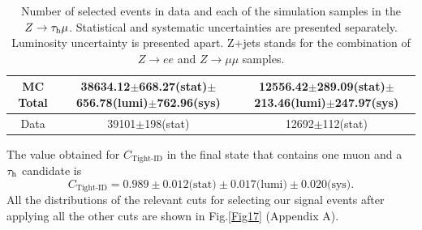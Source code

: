 \begin{table}[H]
{\begin{tabular}{ccc}
		\multicolumn{1}{c|}{MC Total}   & \multicolumn{1}{c|}{38634.12$\pm$668.27(stat)$\pm$656.78(lumi)$\pm$762.96(sys)}                         & 12556.42$\pm$289.09(stat)$\pm$213.46(lumi)$\pm$247.97(sys) \\ \hline
		\multicolumn{1}{c|}{Data}    & \multicolumn{1}{c|}{39101$\pm$198(stat)}                               & 12692$\pm$112(stat)      \\ \hline
	\end{tabular}
	}
	\caption{Number of selected events in data and each of the simulation samples in the $Z\to\tau_\text{h}\mu$. Statistical and systematic uncertainties are presented separately. Luminosity uncertainty is presented apart. Z+jets stands for the combination of $Z\to ee$ and $Z\to\mu\mu$ samples.}
	\label{Table6}
\end{table}
The value obtained for $C_{\text{Tight-ID}}$ in the final state that contains one muon and a $\tau_\text{h}$ candidate is
\begin{equation}
C_{\text{Tight-ID}}=0.989\pm 0.012\text{(stat)}\pm 0.017\text{(lumi)}\pm 0.020\text{(sys)}.
\end{equation}
All the distributions of the relevant cuts for selecting our signal events after applying all the other cuts are shown in Fig.\ref{Fig17} (Appendix A).
